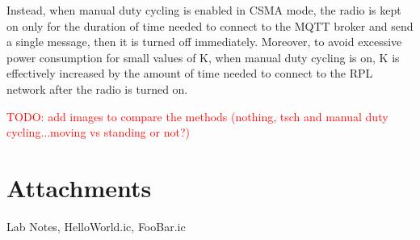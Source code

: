 \documentclass[a4paper, 11pt]{article}
\begin{document}
Instead, when manual duty cycling is enabled in CSMA mode, the radio is kept on only for the duration of time needed to  connect to the MQTT broker and send a single message, then it is turned  off immediately.
Moreover, to avoid excessive power consumption for small values of K, when manual duty cycling is on, K is effectively increased by the amount of  time needed to connect to the RPL network after the radio is turned on.

\textcolor{red}{TODO: add images to compare the methods (nothing, tsch and manual duty cycling...moving vs standing or not?)}

\section*{Attachments}
Lab Notes, HelloWorld.ic, FooBar.ic
\end{document}
